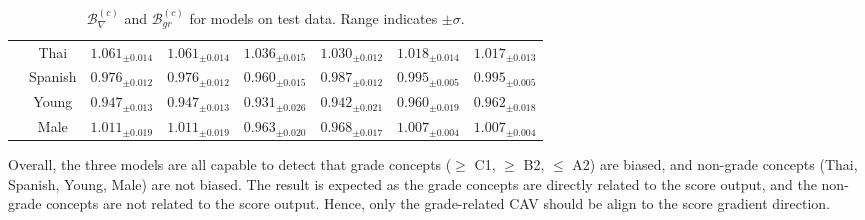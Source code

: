 \begin{table}[H]
\begin{tabular}{|c|c|cc|cc|cc|}
                                                                                 & Thai                              & \multicolumn{1}{c|}{$1.061_{\pm 0.014}$}                   & $1.061_{\pm 0.014}$                   & \multicolumn{1}{c|}{$1.036_{\pm 0.015}$}                   & $1.030_{\pm 0.012}$                  & \multicolumn{1}{c|}{$1.018_{\pm 0.014}$}                   & $1.017_{\pm 0.013}$                  \\
                                                                                 & Spanish                           & \multicolumn{1}{c|}{$0.976_{\pm 0.012}$}                   & $0.976_{\pm 0.012}$                   & \multicolumn{1}{c|}{$0.960_{\pm 0.015}$}                   & $0.987_{\pm 0.012}$                  & \multicolumn{1}{c|}{$0.995_{\pm 0.005}$}                   & $0.995_{\pm 0.005}$                  \\ \cline{2-8}
                                                                                 & Young                             & \multicolumn{1}{c|}{$0.947_{\pm 0.013}$}                   & $0.947_{\pm 0.013}$                   & \multicolumn{1}{c|}{$0.931_{\pm 0.026}$}                   & $0.942_{\pm 0.021}$                  & \multicolumn{1}{c|}{$0.960_{\pm 0.019}$}                   & $0.962_{\pm 0.018}$                  \\ \cline{2-8}
                                                                                 & Male                              & \multicolumn{1}{c|}{$1.011_{\pm 0.019}$}                   & $1.011_{\pm 0.019}$                   & \multicolumn{1}{c|}{$0.963_{\pm 0.020}$}                   & $0.968_{\pm 0.017}$                  & \multicolumn{1}{c|}{$1.007_{\pm 0.004}$}                   & $1.007_{\pm 0.004}$                  \\ \hline
    \end{tabular}
    \caption{$\mathcal{B}^{(c)}_{\nabla}$ and $\mathcal{B}^{(c)}_{gr}$ for models on test data. Range indicates $\pm \sigma$.}
    \label{tab:gradient_distance_combined}
\end{table}

Overall, the three models are all capable to detect that grade concepts ($\geq$ C1, $\geq$ B2, $\leq$ A2) are biased, and non-grade concepts (Thai, Spanish, Young, Male) are not biased. The result is expected as the grade concepts are directly related to the score output, and the non-grade concepts are not related to the score output. Hence, only the grade-related CAV should be align to the score gradient direction.

